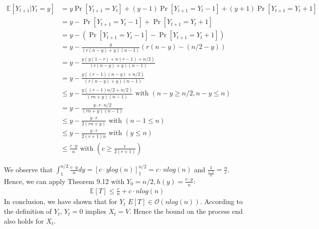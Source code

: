\documentclass[a4paper,german]{article}
\newcommand{\E}{\mathbb{E}}
\begin{document}
\begin{align*}
	\E[Y_{t+1} | Y_t = y] &= y \Pr[Y_{t+1} = Y_t] + (y-1)\Pr[Y_{t+1} = Y_t - 1] + (y+1)\Pr[Y_{t+1} = Y_t + 1] \\
	&=y - \Pr[Y_{t+1} = Y_t - 1] + \Pr[Y_{t+1} = Y_t + 1] \\
	&=y - (\Pr[Y_{t+1} = Y_t - 1] - \Pr[Y_{t+1} = Y_t + 1]) \\
	&= y -\frac{y}{(r(n-y) +y) (n-1)} (r(n-y) - (n/2 - y)) \\
	&=  y - \frac{y (y(1-r) +n (r-1) + n/2)}{(r(n-y) +y) (n-1)} \\
	&=  y - \frac{y ((r-1)(n-y) + n/2)}{(r(n-y) +y) (n-1)} \\
	&\leq y - \frac{y ((r-1)n/2 + n/2)}{(rn +y) (n-1)} \text{ with } (n-y \geq n/2, n-y \leq n) \\
	&= y - \frac{y \cdot r \cdot n/2}{(rn +y) (n-1)}\\
	&\leq y - \frac{y \cdot r}{2(rn +y)} \text { with } (n-1 \leq n)\\
	&\leq y - \frac{y \cdot r}{2(r+1)n} \text { with } (y \leq n) \\
	&\leq \frac{c \cdot y}{n} \text { with } (c \geq \frac{r}{2(r+1)})
\end{align*}

We observe that \( \int_1^{n/2} \frac{c \cdot y}{n} dy =  \left[ c\cdot y log(n)\right]_1^{n/2} = c\cdot n log(n)\) and \(\frac{1}{\frac{c \cdot 1}{n}} = \frac{n}{c}\). Hence, we can apply Theorem 9.12 with \(Y_0 = n/2, h(y) = \frac{c \cdot y}{n}\):
\begin{align*}
	\E[T] \leq \frac{c}{n} + c\cdot n log(n)
\end{align*} 
In conclusion, we have shown that for \(Y_t\) \(E[T] \in \mathcal{O}(nlog(n))\). According to the definition of \(Y_t\),  \(Y_t = 0\) implies \(X_t = V\). Hence the bound on the process end also holds for \(X_t\).
\end{document}
